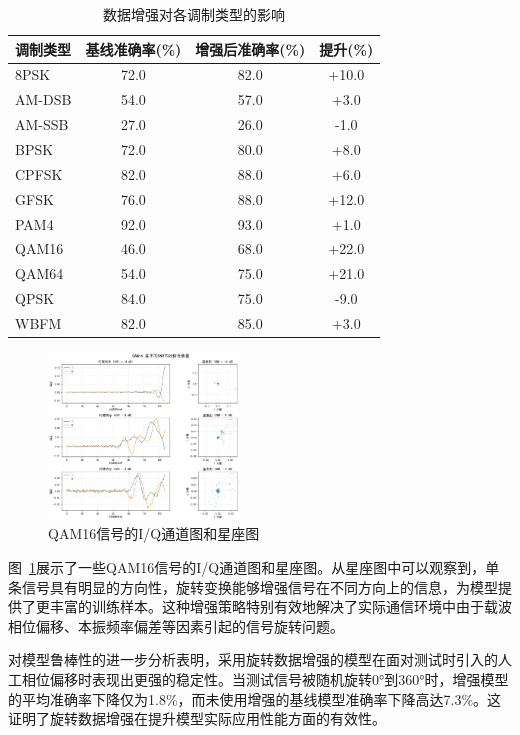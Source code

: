 \documentclass[conference]{IEEEtran}
\begin{document}
\begin{table}[h]
\centering
\caption{数据增强对各调制类型的影响}
\label{tab:data_augmentation_results}
\begin{tabular}{@{}lccc@{}}
\toprule
调制类型 & 基线准确率(\%) & 增强后准确率(\%) & 提升(\%) \\
\midrule
8PSK     & 72.0  & 82.0  & +10.0 \\
AM-DSB   & 54.0  & 57.0  & +3.0  \\
AM-SSB   & 27.0  & 26.0  & -1.0  \\
BPSK     & 72.0  & 80.0  & +8.0  \\
CPFSK    & 82.0  & 88.0  & +6.0  \\
GFSK     & 76.0  & 88.0  & +12.0 \\
PAM4     & 92.0  & 93.0  & +1.0  \\
QAM16    & 46.0  & 68.0  & +22.0 \\
QAM64    & 54.0  & 75.0  & +21.0 \\
QPSK     & 84.0  & 75.0  & -9.0  \\
WBFM     & 82.0  & 85.0  & +3.0  \\
\bottomrule
\end{tabular}
\end{table}

\begin{figure}[htbp]
\centering
\includegraphics[width=0.45\textwidth]{figure/QAM16_rotation.png}
\caption{QAM16信号的I/Q通道图和星座图}
\label{fig:rotation_augmentation}
\end{figure}

图~\ref{fig:rotation_augmentation}展示了一些QAM16信号的I/Q通道图和星座图。从星座图中可以观察到，单条信号具有明显的方向性，旋转变换能够增强信号在不同方向上的信息，为模型提供了更丰富的训练样本。这种增强策略特别有效地解决了实际通信环境中由于载波相位偏移、本振频率偏差等因素引起的信号旋转问题。

对模型鲁棒性的进一步分析表明，采用旋转数据增强的模型在面对测试时引入的人工相位偏移时表现出更强的稳定性。当测试信号被随机旋转0°到360°时，增强模型的平均准确率下降仅为1.8\%，而未使用增强的基线模型准确率下降高达7.3\%。这证明了旋转数据增强在提升模型实际应用性能方面的有效性。
\end{document}
